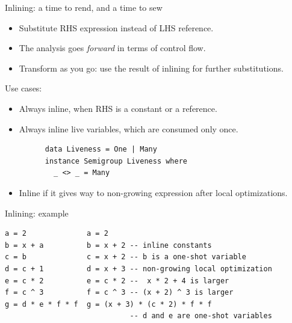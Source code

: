 \documentclass[handout]{beamer}
\begin{document}
\begin{frame}[fragile]{Inlining: a time to rend, and a time to sew}

\begin{itemize}
\item Substitute RHS expression instead of LHS reference.
\item The analysis goes {\em forward} in terms of control flow.
\item Transform as you go: use the result of inlining for further substitutions.
\end{itemize}

Use cases:

\begin{itemize}
\item Always inline, when RHS is a constant or a reference.
\item Always inline live variables, which are consumed only once.
      \begin{lstlisting}
      data Liveness = One | Many
      instance Semigroup Liveness where
        _ <> _ = Many
      \end{lstlisting}
\item Inline if it gives way to non-growing expression after local optimizations.
\end{itemize}

\end{frame}

\begin{frame}[fragile]{Inlining: example}
\begin{adjustwidth}{-1.5em}{-1.5em}

\begin{lstlisting}
a = 2              a = 2
b = x + a          b = x + 2 -- inline constants
c = b              c = x + 2 -- b is a one-shot variable
d = c + 1          d = x + 3 -- non-growing local optimization
e = c * 2          e = c * 2 --  x * 2 + 4 is larger
f = c ^ 3          f = c ^ 3 -- (x + 2) ^ 3 is larger
g = d * e * f * f  g = (x + 3) * (c * 2) * f * f
                             -- d and e are one-shot variables
\end{lstlisting}

\end{adjustwidth}
\end{frame}
\end{document}
